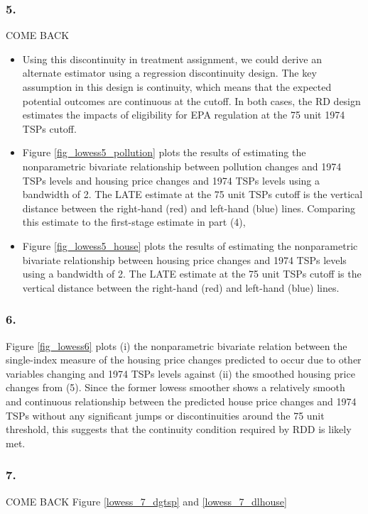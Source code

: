 \documentclass[12pt]{article}
\begin{document}
\subsubsection*{5.}
COME BACK
\begin{itemize}
\item Using this discontinuity in treatment assignment, we could derive an alternate estimator using a regression discontinuity design. The key assumption in this design is continuity, which means that the expected potential outcomes are continuous at the cutoff. In both cases, the RD design estimates the impacts of eligibility for EPA regulation at the 75 unit 1974 TSPs cutoff.
\item Figure \ref{fig_lowess5_pollution} plots the results of estimating the nonparametric bivariate relationship between pollution changes and 1974 TSPs levels and housing price changes and 1974 TSPs levels using a bandwidth of 2. The LATE estimate at the 75 unit TSPs cutoff is the vertical distance between the right-hand (red) and left-hand (blue) lines. Comparing this estimate to the first-stage estimate in part (4), 
\item Figure \ref{fig_lowess5_house} plots the results of estimating the nonparametric bivariate relationship between housing price changes and 1974 TSPs levels using a bandwidth of 2. The LATE estimate at the 75 unit TSPs cutoff is the vertical distance between the right-hand (red) and left-hand (blue) lines.
\end{itemize}





\subsubsection*{6.}
Figure \ref{fig_lowess6} plots (i) the nonparametric bivariate relation between the single-index measure of the housing price changes predicted to occur due to other variables changing and 1974 TSPs levels against (ii) the smoothed housing price changes from (5). Since the former lowess smoother shows a relatively smooth and continuous relationship between the predicted house price changes and 1974 TSPs without any significant jumps or discontinuities around the 75 unit threshold, this suggests that the continuity condition required by RDD is likely met.

\subsubsection*{7.}
COME BACK
Figure \ref{lowess_7_dgtsp} and \ref{lowess_7_dlhouse}
\end{document}
